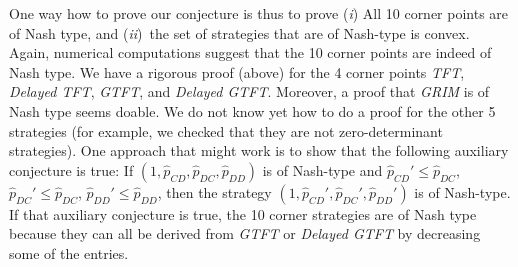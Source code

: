 \documentclass{article}
\theoremstyle{definition}
\begin{document}
\noindent
One way how to prove our conjecture is thus to prove ({\it i}) All 10 corner points are of Nash type, and ({\it ii})~the set of strategies that are of Nash-type is convex. Again, numerical computations suggest that the 10 corner points are indeed of Nash type. We have a rigorous proof (above) for the 4 corner points \emph{TFT}, \emph{Delayed TFT}, \emph{GTFT}, and \emph{Delayed GTFT}.  Moreover, a proof that \emph{GRIM} is of Nash type seems doable. We do not know yet how to do a proof for the other 5 strategies (for example, we checked that they are not zero-determinant strategies). One approach that might work is to show that the following auxiliary conjecture is true: If $(1,\hat{p}_{CD}, \hat{p}_{DC}, \hat{p}_{DD})$ is of Nash-type and $\hat{p}_{CD}' \!\le\! \hat{p}_{DC}$, $\hat{p}_{DC}' \! \le \! \hat{p}_{DC}$, $\hat{p}_{DD}' \!\le\! \hat{p}_{DD}$, then the strategy $(1,\hat{p}_{CD}', \hat{p}_{DC}', \hat{p}_{DD}')$ is of Nash-type. If that auxiliary conjecture is true, the 10 corner strategies are of Nash type because they can all be derived from \emph{GTFT} or \emph{Delayed GTFT} by decreasing some of the entries. 

~\\

\end{document}
